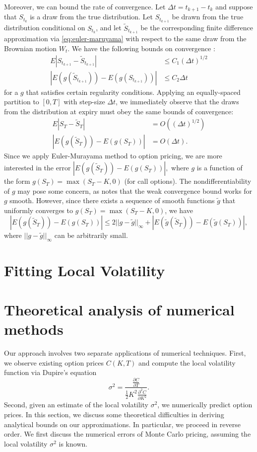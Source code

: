\documentclass[12pt]{article}
\numberwithin{equation}{section}
\newcommand{\diff}[2]{\frac{\partial #1}{\partial #2}}
\newcommand{\abs}[1]{\left|#1\right|}
\newcommand{\norm}[1]{||#1||}
\newcommand{\pr}[1]{\left(#1\right)}
\begin{document}
Moreover, we can bound the rate of convergence. Let $\Delta t = t_{k+1} - t_k$ and suppose that $S_{t_k}$ is a draw from the true distribution. Let $S_{t_{k+1}}$ be drawn from the true distribution conditional on $S_{t_k}$, and let $\tilde S_{t_{k+1}}$ be the corresponding finite difference approximation via \eqref{eq:euler-maruyama} with respect to the same draw from the Brownian motion $W_t$. We have the following bounds on convergence \citep{higham2001algorithmic}: \begin{align}
E\abs{S_{t_{k+1}} - \tilde S_{t_{k+1}}} &\le C_1(\Delta t)^{1/2} \tag{Strong convergence} \\
\abs{E(g(\tilde S_{t_{k+1}})) - E (g(S_{t_{k+1}}))} &\le C_2 \Delta t \tag{Weak convergence}
\end{align}
for a $g$ that satisfies certain regularity conditions. 
Applying an equally-spaced partition to $[0,T]$ with step-size $\Delta t$, we immediately observe that the draws from the distribution at expiry must obey the same bounds of convergence: \begin{align*}
E\abs{S_{T} - \tilde S_{T}} &= O\pr{(\Delta t)^{1/2}} \\
\abs{E(g(\tilde S_{{T}})) - E (g(S_{T}))} &= O(\Delta t).
\end{align*}
Since we apply Euler-Murayama method to option pricing, we are more interested in the error $\abs{E(g(\tilde S_T)) - E(g(S_T))},$ where $g$ is a function of the form $g(S_T) = \max(S_T - K, 0)$ (for call options). The nondifferentiability of $g$ may pose some concern, as \cite{higham2001algorithmic} notes that the weak convergence bound works for $g$ smooth. However, since there exists a sequence of smooth functions $\tilde g$ that uniformly converges to $g(S_T) = \max(S_T - K, 0)$, we have \[
\abs{E(g(\tilde S_T)) - E(g(S_T))} \le 2\norm{g-\tilde g}_\infty + \abs{E(\tilde g(\tilde S_{{T}})) - E (\tilde g(S_{T}))},
\]
where $\norm{g-\tilde g}_\infty$ can be arbitrarily small. 
\section{Fitting Local Volatility}
\label{sec:localvolfitting}


\section{Theoretical analysis of numerical methods}
\label{sec:theory}
Our approach involves two separate applications of numerical techniques. First, we observe existing option prices $C(K,T)$ and compute the local volatility function via Dupire's equation \[
\sigma^2 = \frac{\diff{C}{T}}{\frac{1}{2}K^2\diff{^2C}{K^2}}.
\] 
Second, given an estimate of the local volatility $\sigma^2$, we numerically predict option prices. In this section, we discuss some theoretical difficulties in deriving analytical bounds on our approximations. In particular, we proceed in reverse order. We first discuss the numerical errors of Monte Carlo pricing, assuming the local volatility $\sigma^2$ is known.
\end{document}
